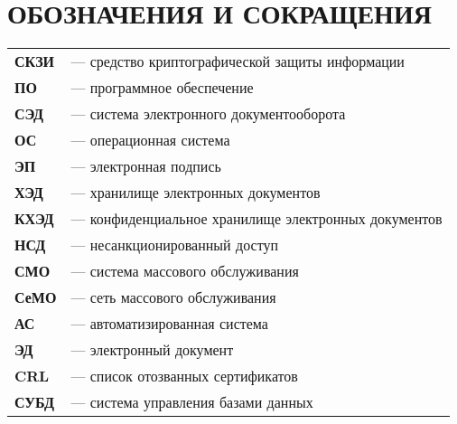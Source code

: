 \chapter*{ОБОЗНАЧЕНИЯ И СОКРАЩЕНИЯ}
\begin{tabular}{ll}

\textbf{СКЗИ} & --- средство криптографической защиты информации \\
\textbf{ПО} & --- программное обеспечение \\
\textbf{СЭД} & --- система электронного документооборота \\
\textbf{ОС} & --- операционная система \\
\textbf{ЭП} & --- электронная подпись \\
\textbf{ХЭД} & --- хранилище электронных документов \\
\textbf{КХЭД} & --- конфиденциальное хранилище электронных документов \\
\textbf{НСД} & --- несанкционированный доступ \\
\textbf{СМО} & --- система массового обслуживания \\
\textbf{СеМО} & --- сеть массового обслуживания \\
\textbf{АС} & --- автоматизированная система \\
\textbf{ЭД} & --- электронный документ \\
\textbf{CRL} & --- список отозванных сертификатов  \\
\textbf{СУБД} & --- система управления базами данных \\
\end{tabular}
\clearpage